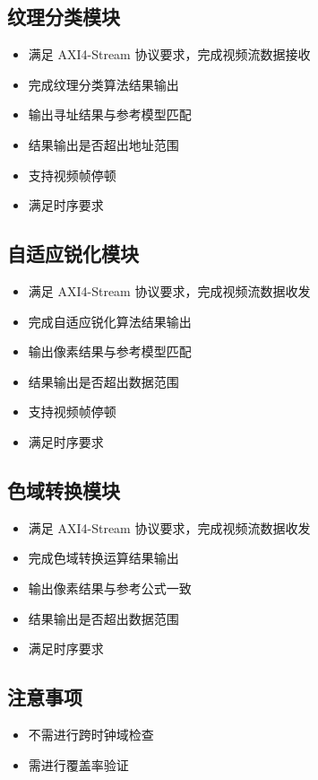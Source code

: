 \documentclass[12pt, a4paper, oneside]{ctexbook}
\begin{document}
	\subsection{纹理分类模块}
	\begin{itemize}
		\item 满足 AXI4-Stream 协议要求，完成视频流数据接收
		\item 完成纹理分类算法结果输出
		\item 输出寻址结果与参考模型匹配
		\item 结果输出是否超出地址范围
		\item 支持视频帧停顿
		\item 满足时序要求
	\end{itemize}
	
	\subsection{自适应锐化模块}
	\begin{itemize}
		\item 满足 AXI4-Stream 协议要求，完成视频流数据收发
		\item 完成自适应锐化算法结果输出
		\item 输出像素结果与参考模型匹配
		\item 结果输出是否超出数据范围
		\item 支持视频帧停顿
		\item 满足时序要求		
	\end{itemize}
	
	\subsection{色域转换模块}
	\begin{itemize}
		\item 满足 AXI4-Stream 协议要求，完成视频流数据收发
		\item 完成色域转换运算结果输出
		\item 输出像素结果与参考公式一致
		\item 结果输出是否超出数据范围
		\item 满足时序要求		
	\end{itemize}
	
	\subsection{注意事项}
	\begin{itemize}
		\item 不需进行跨时钟域检查
		\item 需进行覆盖率验证	
	\end{itemize}		
	
\end{document}
